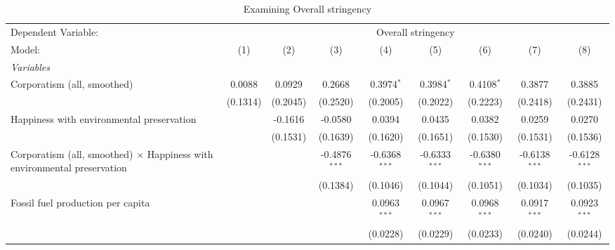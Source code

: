 
\begin{table}[htbp]
   \caption{Examining Overall stringency}
   \centering
   \begin{tabular}{lcccccccc}
      \tabularnewline \midrule \midrule
      Dependent Variable: & \multicolumn{8}{c}{Overall stringency}\\
      Model:                                                                          & (1)                   & (2)      & (3)             & (4)             & (5)             & (6)             & (7)             & (8)\\  
      \midrule
      \emph{Variables}\\
      Corporatism (all, smoothed)                                                     & 0.0088                & 0.0929   & 0.2668          & 0.3974$^{*}$    & 0.3984$^{*}$    & 0.4108$^{*}$    & 0.3877          & 0.3885\\   
                                                                                      & (0.1314)              & (0.2045) & (0.2520)        & (0.2005)        & (0.2022)        & (0.2223)        & (0.2418)        & (0.2431)\\   
      Happiness with environmental preservation                                       &                       & -0.1616  & -0.0580         & 0.0394          & 0.0435          & 0.0382          & 0.0259          & 0.0270\\   
                                                                                      &                       & (0.1531) & (0.1639)        & (0.1620)        & (0.1651)        & (0.1530)        & (0.1531)        & (0.1536)\\   
      Corporatism (all, smoothed) $\times$ Happiness with environmental preservation  &                       &          & -0.4876$^{***}$ & -0.6368$^{***}$ & -0.6333$^{***}$ & -0.6380$^{***}$ & -0.6138$^{***}$ & -0.6128$^{***}$\\   
                                                                                      &                       &          & (0.1384)        & (0.1046)        & (0.1044)        & (0.1051)        & (0.1034)        & (0.1035)\\   
      Fossil fuel production per capita                                               &                       &          &                 & 0.0963$^{***}$  & 0.0967$^{***}$  & 0.0968$^{***}$  & 0.0917$^{***}$  & 0.0923$^{***}$\\   
                                                                                      &                       &          &                 & (0.0228)        & (0.0229)        & (0.0233)        & (0.0240)        & (0.0244)\\   

\end{tabular}
\end{table}
